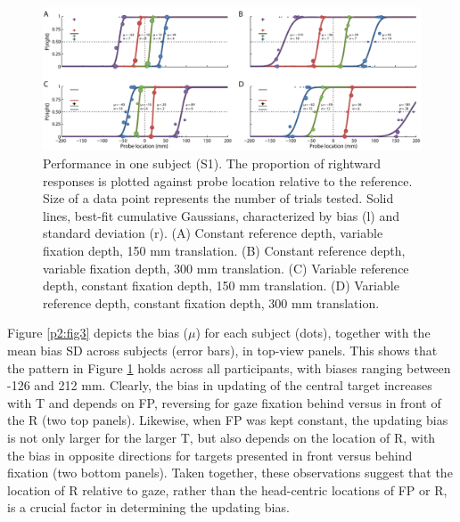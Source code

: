 \begin{figure}
    \includegraphics[width=1.0\textwidth]{src/paper2/figure2.pdf}
    
    \caption{Performance in one subject (S1). The proportion of rightward responses is plotted against probe location relative to the reference. Size of a data point represents the number of trials tested. Solid lines, best-fit cumulative Gaussians, characterized by bias (l) and standard deviation (r). (A) Constant reference depth, variable fixation depth, 150 mm translation. (B) Constant reference depth, variable fixation depth, 300 mm translation. (C) Variable reference depth, constant fixation depth, 150 mm translation. (D) Variable reference depth, constant fixation depth, 300 mm translation.}
    
    \label{p2:fig2}
\end{figure}

Figure \ref{p2:fig3} depicts the bias ($\mu$) for each subject (dots), together with the mean bias {\textpm}SD across subjects (error bars), in top-view panels. This shows that the pattern in Figure \ref{p2:fig2} holds across all participants, with biases ranging between -126 and 212 mm. Clearly, the bias in updating of the central target increases with T and depends on FP, reversing for gaze fixation behind versus in front of the R (two top panels). Likewise, when FP was kept constant, the updating bias is not only larger for the larger T, but also depends on the location of R, with the bias in opposite directions for targets presented in front versus behind fixation (two bottom panels). Taken together, these observations suggest that the location of R relative to gaze, rather than the head-centric locations of FP or R, is a crucial factor in determining the updating bias. 

